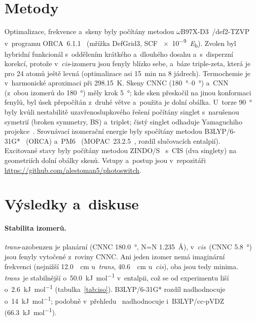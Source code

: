 \documentclass[11pt,a4paper]{article}
\newcommand{\cis}{\textit{cis}}
\newcommand{\trans}{\textit{trans}}
\begin{document}
\section*{Metody}
Optimalizace, frekvence a~skeny byly počítány metodou $\omega$B97X-D3~\cite{Lin2013}/def2-TZVP~\cite{Weigend2005}
v~programu ORCA~6.1.1~\cite{Neese2025} (mřížka DefGrid3, SCF \SI{e-9}{\hartree}). Zvolen byl hybridní
funkcionál s~oddělením krátkého a~dlouhého dosahu a~s~disperzní korekcí, protože v~\cis-izomeru jsou fenyly
blízko sebe, a~báze triple-zeta, která je pro 24 atomů ještě levná (optimalizace asi \SI{15}{\minute} na
8 jádrech). Termochemie je v~harmonické aproximaci při \SI{298.15}{\kelvin}. Skeny CNNC
(\SIrange{180}{0}{\degree}) a~CNN (z~obou izomerů do \SI{180}{\degree}) měly krok \SI{5}{\degree}; kde sken
přeskočil na jinou konformaci fenylů, byl úsek přepočítán z~druhé větve a~použita je dolní obálka. U~torze
\SI{90}{\degree} byly kvůli nestabilitě uzavřenoslupkového řešení počítány singlet s~narušenou symetrií
(broken symmetry, BS) a~triplet; čistý singlet odhaduje Yamaguchiho projekce~\cite{Yamaguchi1988}.
Srovnávací izomerační energie byly spočítány metodou \mbox{B3LYP/6-31G*}~\cite{Becke1993,Lee1988} (ORCA)
a~PM6~\cite{Stewart2007} (MOPAC~23.2.5~\cite{MOPAC}, rozdíl slučovacích entalpií). Excitované stavy byly
počítány metodou ZINDO/S~\cite{Ridley1973} s~CIS (dva singlety) na geometriích dolní obálky skenů. Vstupy a~postup jsou
v~repozitáři \url{https://github.com/alestoman5/photoswitch}.

\section*{Výsledky a~diskuse}

\paragraph{Stabilita izomerů.}
\trans-azobenzen je planární (CNNC \SI{180.0}{\degree}, N=N \SI{1.235}{\angstrom}), v~\cis\ (CNNC
\SI{5.8}{\degree}) jsou fenyly vytočené z~roviny CNNC. Ani jeden izomer nemá imaginární frekvenci (nejnižší
\SI{12.0}{\per\centi\metre} u~\trans, \SI{40.6}{\per\centi\metre} u~\cis), oba jsou tedy minima. \trans\ je
stabilnější o~\SI{50.0}{\kilo\joule\per\mole} v~entalpii, což se od experimentu liší o~\SI{2.6}{\kilo\joule\per\mole}
(tabulka~\ref{tab:iso}). \mbox{B3LYP/6-31G*} rozdíl nadhodnocuje o~\SI{14}{\kilo\joule\per\mole}; podobně v~přehledu~\cite{Cammenga2009}
nadhodnocuje i~B3LYP/cc-pVDZ (\SI{66.3}{\kilo\joule\per\mole}).
\end{document}

